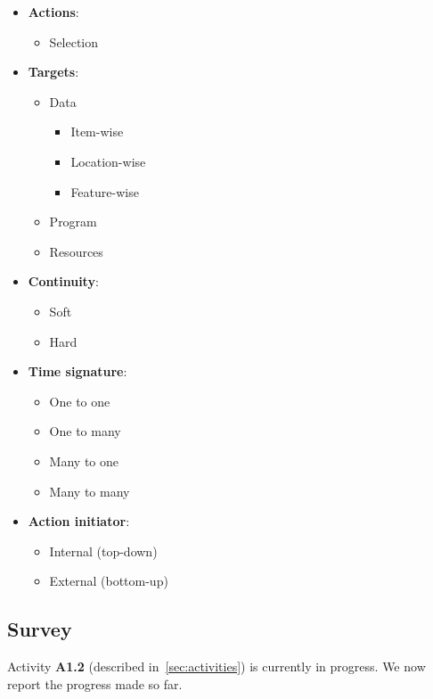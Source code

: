 \documentclass[12pt]{article}
\begin{document}
\begin{itemize}
    \item \textbf{Actions}:
    \begin{itemize}
        \item Selection
    \end{itemize}

    \item \textbf{Targets}:
    \begin{itemize}
        \item Data
        \begin{itemize}
            \item Item-wise
            \item Location-wise
            \item Feature-wise
        \end{itemize}
        \item Program
        \item Resources
    \end{itemize}

    \item \textbf{Continuity}:
    \begin{itemize}
        \item Soft
        \item Hard
    \end{itemize}

    \item \textbf{Time signature}:
    \begin{itemize}
        \item One to one
        \item One to many
        \item Many to one
        \item Many to many
    \end{itemize}

    \item \textbf{Action initiator}:
    \begin{itemize}
        \item Internal (top-down)
        \item External (bottom-up)
    \end{itemize}
\end{itemize}

\subsection{Survey}
Activity \textbf{A1.2} (described in~\ref{sec:activities}) is currently in progress.
We now report the progress made so far.
\end{document}
